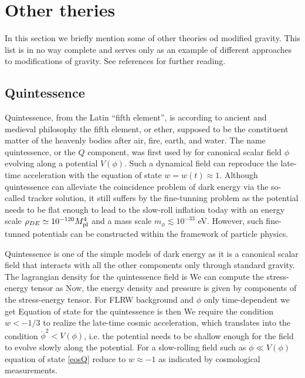 \section{Other theries}
In this section we briefly mention some of other theories od modified gravity. This list is in no way complete and serves only as an example of different approaches to modifications of gravity. See references for further reading.
\subsection{Quintessence}
Quintessence, from the Latin ``fifth element'', is according to ancient and medieval philosophy the fifth element, or ether, supposed to be the constituent matter of the heavenly bodies after air, fire, earth, and water. The name quintessence, or the $Q$ component, was first used by \textcite{1998PhRvL..80.1582C} for canonical scalar field $\phi$ evolving along a potential $V(\phi)$. Such a dynamical field can reproduce the late-time acceleration with the equation of state $w=w(t)\approx1$. Although quintessence can alleviate the coincidence problem of dark energy via the so-called tracker solution, it still suffers by the fine-tunning problem as the potential needs to be flat enough to lead to the slow-roll inflation today with an energy scale $\rho_{DE}\simeq10^{-120}M_{\text{\scriptsize pl}}^4$ and a mass scale $m_\phi\lesssim10^{-33}$ eV. However, such fine-tunned potentials can be constructed within the framework of particle physics.

Quintessence is one of the simple models of dark energy as it is a canonical scalar field that interacts with all the other components only through standard gravity. The lagrangian density for the quintessence field is
We can compute the stress-energy tensor as
Now, the energy density and pressure is given by components of the stress-energy tensor. For FLRW background and $\phi$ only time-dependent we get
Equation of state for the quintessence is then
We require the condition $w<-1/3$ to realize the late-time cosmic acceleration, which translates into the condition  $\dot{\phi}^2<V(\phi)$, i.e. the potential needs to be shallow enough for the field to evolve slowly along the potential. For a slow-rolling field such as $\dot{\phi}\ll V(\phi)$ equation of state \eqref{eosQ} reduce to $w\approx-1$ as indicated by cosmological measurements.

